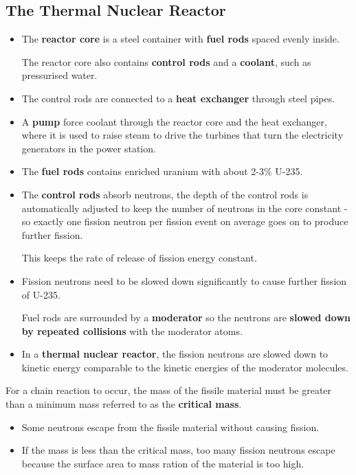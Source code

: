 \subsection{The Thermal Nuclear Reactor}
\begin{itemize}
    \item The \textbf{reactor core} is a steel container with \textbf{fuel rods} spaced evenly inside.

        The reactor core also contains \textbf{control rods} and a \textbf{coolant}, such as pressurised water.
    \item The control rods are connected to a \textbf{heat exchanger} through steel pipes.
    \item A \textbf{pump} force coolant through the reactor core and the heat exchanger, where it is used to raise steam to drive the turbines that turn the electricity generators in the power station.
    \item The \textbf{fuel rods} contains enriched uranium with about 2-3\% U-235.
    \item The \textbf{control rods} absorb neutrons, the depth of the control rods is automatically adjusted to keep the number of neutrons in the core constant - so exactly one fission neutron per fission event on average goes on to produce further fission.

        This keeps the rate of release of fission energy constant.
    \item Fission neutrons need to be slowed down significantly to cause further fission of U-235.

        Fuel rods are surrounded by a \textbf{moderator} so the neutrons are \textbf{slowed down by repeated collisions} with the moderator atoms.
    \item In a \textbf{thermal nuclear reactor}, the fission neutrons are slowed down to kinetic energy comparable to the kinetic energies of the moderator molecules.
\end{itemize}

For a chain reaction to occur, the mass of the fissile material must be greater than a minimum mass referred to as the \textbf{critical mass}.
\begin{itemize}
    \item Some neutrons escape from the fissile material without causing fission.
    \item If the mass is less than the critical mass, too many fission neutrons escape because the surface area to mass ration of the material is too high.
\end{itemize}

